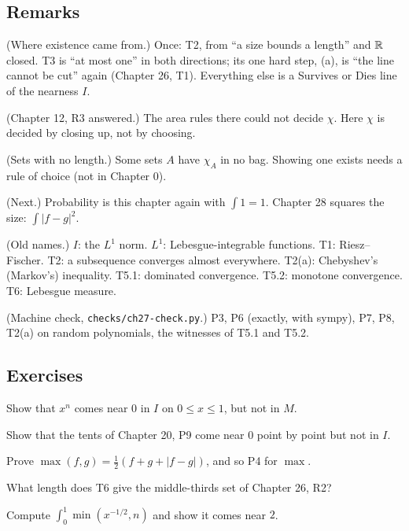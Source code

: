 \subsection*{Remarks}

\begin{lines}
\item[\lab{R1}] (Where existence came from.) Once: T2, from ``a size bounds a length'' and $\mathbb{R}$ closed. T3 is ``at most one'' in both directions; its one hard step, (a), is ``the line cannot be cut'' again (Chapter 26, T1). Everything else is a Survives or Dies line of the nearness $I$.
\item[\lab{R2}] (Chapter 12, R3 answered.) The area rules there could not decide $\chi$. Here $\chi$ is decided by closing up, not by choosing.
\item[\lab{R3}] (Sets with no length.) Some sets $A$ have $\chi_A$ in no bag. Showing one exists needs a rule of choice (not in Chapter 0).
\item[\lab{R4}] (Next.) Probability is this chapter again with $\int 1 = 1$. Chapter 28 squares the size: $\int |f - g|^2$.
\item[\lab{R5}] (Old names.) $I$: the $L^1$ norm. $L^1$: Lebesgue-integrable functions. T1: Riesz--Fischer. T2: a subsequence converges almost everywhere. T2(a): Chebyshev's (Markov's) inequality. T5.1: dominated convergence. T5.2: monotone convergence. T6: Lebesgue measure.
\item[\lab{R6}] (Machine check, \texttt{checks/ch27-check.py}.) P3, P6 (exactly, with sympy), P7, P8, T2(a) on random polynomials, the witnesses of T5.1 and T5.2.
\end{lines}

\subsection*{Exercises}

\begin{lines}
\item[\lab{E1}] Show that $x^n$ comes near $0$ in $I$ on $0 \le x \le 1$, but not in $M$.
\item[\lab{E2}] Show that the tents of Chapter 20, P9 come near $0$ point by point but not in $I$.
\item[\lab{E3}] Prove $\max(f, g) = \tfrac12(f + g + |f - g|)$, and so P4 for $\max$.
\item[\lab{E4}] What length does T6 give the middle-thirds set of Chapter 26, R2?
\item[\lab{E5}] Compute $\int_0^1 \min(x^{-1/2}, n)$ and show it comes near $2$.
\end{lines}


